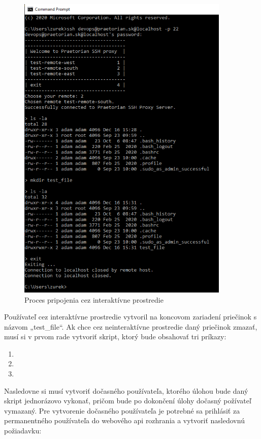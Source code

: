 \begin{figure}[H]
\begin{center}\includegraphics[width=\textwidth,height=15cm,keepaspectratio=true]{assets/interactive_session.png}\end{center}
\caption[Proces pripojenia cez interaktívne prostredie]{Proces pripojenia cez interaktívne prostredie}\label{fig:obr_16}
\end{figure}

Používateľ cez interaktívne prostredie vytvoril na koncovom zariadení priečinok s názvom „test\_file“.
Ak chce cez neinteraktívne prostredie daný priečinok zmazať, musí si v prvom rade vytvoriť skript, ktorý bude obsahovať
tri príkazy:
\newpage

\begin{enumerate}
  \item {}
  \item {}
  \item {}
\end{enumerate}

Nasledovne si musí vytvoriť dočasného používateľa, ktorého úlohou bude daný skript jednorázovo vykonať, pričom bude po
dokončení úlohy dočasný požívateľ vymazaný.
Pre vytvorenie dočasného používateľa je potrebné sa prihlásiť za permanentného používateľa do webového api rozhrania a
vytvoriť nasledovnú požiadavku:

